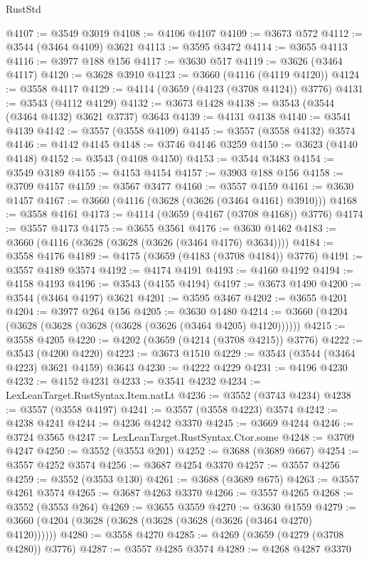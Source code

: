 \begin{lexlean}{RustStd}
\begin{coremodule}
@4107 := @3549 @3019
@4108 := @4106 @4107
@4109 := @3673 @572
@4112 := @3544 (@3464 @4109) @3621
@4113 := @3595 @3472
@4114 := @3655 @4113
@4116 := @3977 @188 @156
@4117 := @3630 @517
@4119 := @3626 (@3464 @4117)
@4120 := @3628 @3910
@4123 := @3660 (@4116 (@4119 @4120))
@4124 := @3558 @4117
@4129 := @4114 (@3659 (@4123 (@3708 @4124)) @3776)
@4131 := @3543 (@4112 @4129)
@4132 := @3673 @1428
@4138 := @3543 (@3544 (@3464 @4132) @3621 @3737) @3643
@4139 := @4131 @4138
@4140 := @3541 @4139
@4142 := @3557 (@3558 @4109)
@4145 := @3557 (@3558 @4132) @3574
@4146 := @4142 @4145
@4148 := @3746 @4146 @3259
@4150 := @3623 (@4140 @4148)
@4152 := @3543 (@4108 @4150)
@4153 := @3544 @3483
@4154 := @3549 @3189
@4155 := @4153 @4154
@4157 := @3903 @188 @156
@4158 := @3709 @4157
@4159 := @3567 @3477
@4160 := @3557 @4159
@4161 := @3630 @1457
@4167 := @3660 (@4116 (@3628 (@3626 (@3464 @4161) @3910)))
@4168 := @3558 @4161
@4173 := @4114 (@3659 (@4167 (@3708 @4168)) @3776)
@4174 := @3557 @4173
@4175 := @3655 @3561
@4176 := @3630 @1462
@4183 := @3660 (@4116 (@3628 (@3628 (@3626 (@3464 @4176) @3634))))
@4184 := @3558 @4176
@4189 := @4175 (@3659 (@4183 (@3708 @4184)) @3776)
@4191 := @3557 @4189 @3574
@4192 := @4174 @4191
@4193 := @4160 @4192
@4194 := @4158 @4193
@4196 := @3543 (@4155 @4194)
@4197 := @3673 @1490
@4200 := @3544 (@3464 @4197) @3621
@4201 := @3595 @3467
@4202 := @3655 @4201
@4204 := @3977 @264 @156
@4205 := @3630 @1480
@4214 := @3660 (@4204 (@3628 (@3628 (@3628 (@3628 (@3626 (@3464 @4205) @4120))))))
@4215 := @3558 @4205
@4220 := @4202 (@3659 (@4214 (@3708 @4215)) @3776)
@4222 := @3543 (@4200 @4220)
@4223 := @3673 @1510
@4229 := @3543 (@3544 (@3464 @4223) @3621 @4159) @3643
@4230 := @4222 @4229
@4231 := @4196 @4230
@4232 := @4152 @4231
@4233 := @3541 @4232
@4234 := LexLeanTarget.RustSyntax.Item.natLt
@4236 := @3552 (@3743 @4234)
@4238 := @3557 (@3558 @4197)
@4241 := @3557 (@3558 @4223) @3574
@4242 := @4238 @4241
@4244 := @4236 @4242 @3370
@4245 := @3669 @4244
@4246 := @3724 @3565
@4247 := LexLeanTarget.RustSyntax.Ctor.some
@4248 := @3709 @4247
@4250 := @3552 (@3553 @201)
@4252 := @3688 (@3689 @667)
@4254 := @3557 @4252 @3574
@4256 := @3687 @4254 @3370
@4257 := @3557 @4256
@4259 := @3552 (@3553 @130)
@4261 := @3688 (@3689 @675)
@4263 := @3557 @4261 @3574
@4265 := @3687 @4263 @3370
@4266 := @3557 @4265
@4268 := @3552 (@3553 @264)
@4269 := @3655 @3559
@4270 := @3630 @1559
@4279 := @3660 (@4204 (@3628 (@3628 (@3628 (@3628 (@3626 (@3464 @4270) @4120))))))
@4280 := @3558 @4270
@4285 := @4269 (@3659 (@4279 (@3708 @4280)) @3776)
@4287 := @3557 @4285 @3574
@4289 := @4268 @4287 @3370

\end{coremodule}
\end{lexlean}
